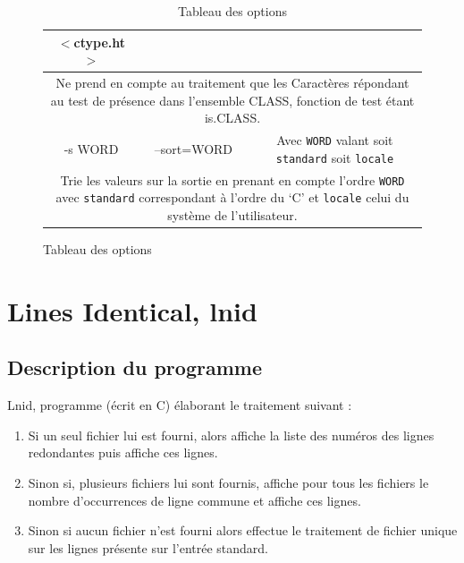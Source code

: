 \documentclass[12pt]{article}
\begin{document}
\begin{table}[H]
\begin{figure}[H]
\begin{tabular}{|c|c|c|}
{{                    $<$ctype.ht$>$}} \\ [1.3em]
                \hline
                    \multicolumn{3}{|c|}{\cellcolor{blue-u!7}\rule{0pt}{2em}
                    \parbox{15cm}{Ne prend en compte au traitement que les 
                    Caractères répondant au test  de présence dans l'ensemble 
                    CLASS, fonction de test étant is.CLASS.}}\\[.8em]
                \hline
                    \cellcolor{blue-s!25} -s WORD & \cellcolor{blue-s!25} 
                    --sort=WORD & \cellcolor{blue-t!70}Avec \texttt{WORD} valant
                    soit \texttt{standard} soit \texttt{locale} \\
                \hline
                    \multicolumn{3}{|c|}{\cellcolor{blue-u!7}\rule{0pt}{2em}
                    \parbox{15cm}{{Trie les valeurs sur la sortie en prenant en 
                    compte l'ordre \texttt{WORD} avec \texttt{standard}} 
                    correspondant à l'ordre du  `C' et \texttt{locale} celui du 
                    système de l'utilisateur.}}\\[1em]
                \hline
            \end{tabular}
            \captionsetup{position=bottom}
            \caption{Tableau des options}\label{table-opt}
        \end{figure}
    \end{table}

    \newpage

    \section{Lines Identical, lnid}

    \subsection{Description du programme}

    Lnid, programme (écrit en C) élaborant le traitement suivant :
    \begin{enumerate}
        \item[] Si un seul fichier lui est fourni, alors affiche la liste 
        des numéros des lignes redondantes puis affiche ces lignes.
        \item[] Sinon si, plusieurs fichiers lui sont fournis, affiche pour
         tous les fichiers le nombre d'occurrences de ligne commune et 
         affiche ces lignes.
        \item[] Sinon si aucun fichier n'est fourni alors effectue le 
        traitement de fichier unique sur les lignes présente sur l'entrée 
        standard.
    \end{enumerate}
\end{document}
